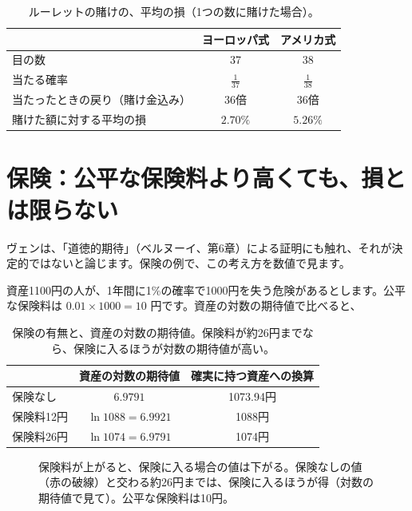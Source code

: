 \documentclass[a4paper,11pt,openany]{ltjsbook}
\begin{document}
\begin{table}[htbp]
\centering
\begin{tabular}{lcc}
\toprule
 & ヨーロッパ式 & アメリカ式\\
\midrule
目の数 & 37 & 38\\
当たる確率 & $\tfrac1{37}$ & $\tfrac1{38}$\\
当たったときの戻り（賭け金込み） & 36倍 & 36倍\\
賭けた額に対する平均の損 & $2.70\%$ & $5.26\%$\\
\bottomrule
\end{tabular}
\caption{ルーレットの賭けの、平均の損（1つの数に賭けた場合）。}
\end{table}

\section{保険：公平な保険料より高くても、損とは限らない}

ヴェンは、「道徳的期待」（ベルヌーイ、第6章）による証明にも触れ、それが決定的ではないと論じます。保険の例で、この考え方を数値で見ます。

資産1100円の人が、1年間に1\%の確率で1000円を失う危険があるとします。公平な保険料は $0.01\times1000=10$ 円です。資産の対数の期待値で比べると、

\begin{table}[htbp]
\centering
\begin{tabular}{lcc}
\toprule
 & 資産の対数の期待値 & 確実に持つ資産への換算\\
\midrule
保険なし & $6.9791$ & 1073.94円\\
保険料12円 & $\ln1088=6.9921$ & 1088円\\
保険料26円 & $\ln1074=6.9791$ & 1074円\\
\bottomrule
\end{tabular}
\caption{保険の有無と、資産の対数の期待値。保険料が約26円までなら、保険に入るほうが対数の期待値が高い。}
\end{table}

\begin{figure}[htbp]
\centering
{}
\caption{保険料が上がると、保険に入る場合の値は下がる。保険なしの値（赤の破線）と交わる約26円までは、保険に入るほうが得（対数の期待値で見て）。公平な保険料は10円。}
\end{figure}
\end{document}
